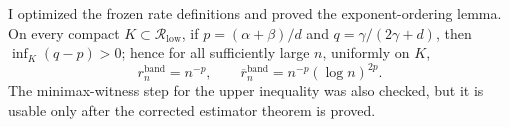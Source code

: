 I optimized the frozen rate definitions and proved the exponent-ordering lemma.  On every compact \(K\subset\mathcal R_{\mathrm{low}}\), if \(p=(\alpha+\beta)/d\) and \(q=\gamma/(2\gamma+d)\), then \(\inf_K(q-p)>0\); hence for all sufficiently large \(n\), uniformly on \(K\),
\[
r_n^{\mathrm{band}}=n^{-p},\qquad
\overline r_n^{\mathrm{band}}=n^{-p}(\log n)^{2p}.
\]
The minimax-witness step for the upper inequality was also checked, but it is usable only after the corrected estimator theorem is proved.